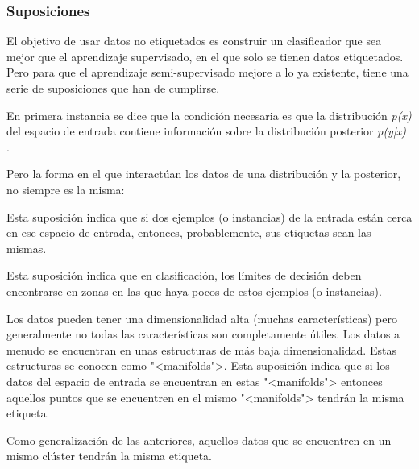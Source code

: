 \subsubsection{Suposiciones}
El objetivo de usar datos no etiquetados es construir un clasificador que sea
mejor que el aprendizaje supervisado, en el que solo se tienen datos
etiquetados. Pero para que el aprendizaje semi-supervisado mejore a lo ya
existente, tiene una serie de suposiciones que han de cumplirse.

En primera instancia se dice que la condición necesaria es que la distribución
\textit{p(x)} del espacio de entrada contiene información sobre la distribución
posterior \textit{p(y|x)} \cite{vanEngelen2020}.

Pero la forma en el que interactúan los datos de una distribución y la posterior,
no siempre es la misma:

\begin{tcolorbox}[colback=cyan!5!white,colframe=cyan!75!black,title=\textit{Smoothness assumption}]
    Esta suposición indica que si dos ejemplos (o instancias) de la entrada
    están cerca en ese espacio de entrada, entonces, probablemente, sus
    etiquetas sean las mismas.
\end{tcolorbox}

\begin{tcolorbox}[colback=cyan!5!white,colframe=cyan!75!black,title=\textit{Low-density assumption}]
    Esta suposición indica que en clasificación, los límites de decisión deben
    encontrarse en zonas en las que haya pocos de estos ejemplos (o instancias).
\end{tcolorbox}

\begin{tcolorbox}[colback=cyan!5!white,colframe=cyan!75!black,title=\textit{Manifold assumption}]
    Los datos pueden tener una dimensionalidad alta (muchas características)
    pero generalmente no todas las características son completamente útiles. Los
    datos a menudo se encuentran en unas estructuras de más baja
    dimensionalidad. Estas estructuras se conocen como "<manifolds">. Esta
    suposición indica que si los datos del espacio de entrada se encuentran en
    estas "<manifolds"> entonces aquellos puntos que se encuentren en el mismo
    "<manifolds"> tendrán la misma etiqueta. \cite{towardsdatascience:semi,vanEngelen2020}
\end{tcolorbox}

\begin{tcolorbox}[colback=cyan!5!white,colframe=cyan!75!black,title=\textit{Cluster assumption}]
    Como generalización de las anteriores, aquellos datos que se encuentren en
    un mismo clúster tendrán la misma etiqueta.
\end{tcolorbox}


